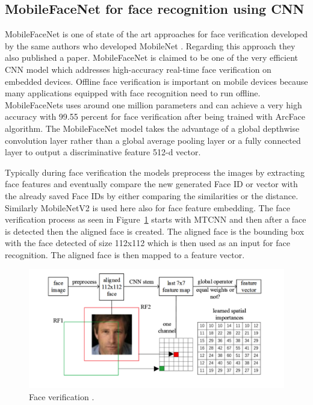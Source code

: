 \subsection{MobileFaceNet for face recognition using CNN}

MobileFaceNet is one of state of the art approaches for face verification developed by the same authors who developed MobileNet \cite{howard2017mobilenets}. Regarding this approach they also published a paper. MobileFaceNet \cite{Chen2018MobileFaceNetsEC} is claimed to be one of the very efficient CNN model which addresses high-accuracy real-time face verification on embedded devices. Offline face verification is important on mobile devices because many applications equipped with face recognition need to run offline. 
MobileFaceNets uses around one million parameters and can achieve a very high accuracy with 99.55 percent for face verification after being trained with ArcFace algorithm. The MobileFaceNet model takes the advantage of a global
depthwise convolution layer rather than a global average pooling layer or a fully
connected layer to output a discriminative feature 512-d vector. 

Typically during face verification the models preprocess the images by extracting face features and eventually compare the new generated Face ID or vector with the already saved Face IDs by either comparing the similarities or the distance. Similarly MobileNetV2 is used here also for face feature embedding. The face verification process as seen in Figure~\ref{fig:face_ver} starts with MTCNN and then after a face is detected then the aligned face is created. The aligned face is the bounding box with the face detected of size 112x112 which is then used as an input for face recognition. The aligned face is then mapped to a feature vector. 


\begin{figure}[!htb]
    \centering
    \includegraphics[width=1\textwidth]{figures/face_recognition.png}
    \caption{Face verification \cite{Chen2018MobileFaceNetsEC}.}
    \label{fig:face_ver}
\end{figure}

